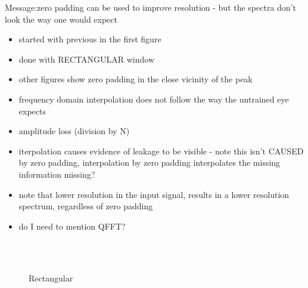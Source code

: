
Message:zero padding can be used to improve resolution - but the spectra don't look the way one would expect
\begin{itemize}
\item started with previous in the first figure
\item done with RECTANGULAR window
\item other figures show zero padding in the close vicinity of the peak
\item frequency domain interpolation does not follow the way the untrained eye expects
\item amplitude loss (division by N)
\item iterpolation causes evidence of leakage to be visible - note this isn't CAUSED by zero padding, interpolation by zero padding interpolates the missing information missing?
\item note that lower resolution in the input signal, results in a lower resolution spectrum, regardless of zero padding
\item do I need to mention QFFT?
\end{itemize}

\begin{figure}[!ht]
	\centering
   \\
   \\
  \caption{Rectangular}
%
\end{figure}

